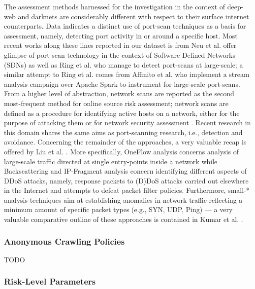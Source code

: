The assessment methods harnessed for the investigation in the context of deep-web and darknets are considerably different with respect to their surface internet counterparts. Data indicates a distinct use of port-scan \cite{GadgeP08,KikuchiFTD08} techniques as a basis for assessment, namely, detecting port activity in or around a specific host. Most recent works along these lines reported in our dataset is from Neu et al. \cite{NeuTLMOZ18} offer glimpse of port-scan technology in the context of Software-Defined Networks (SDNs) \cite{sorensen2012} as well as Ring et al. \cite{ring2018} who manage to detect port-scans at large-scale; a similar attempt to Ring et al. comes from Affinito et al. \cite{Affinito2018} who implement a stream analysis campaign over Apache Spark to instrument for large-scale port-scans. From a higher level of abstraction, network scans \cite{MazelFF16} are reported as the second most-frequent method for online source risk assessment; network scans are defined as a procedure for identifying active hosts on a network, either for the purpose of attacking them or for network security assessment \cite{LeckieR02}. Recent research in this domain shares the same aims as port-scanning research, i.e., detection and avoidance. Concerning the remainder of the approaches, a very valuable recap is offered by Liu et al. \cite{LiuF18}. More specifically, OneFlow analysis concerns analysis of large-scale traffic directed at single entry-points inside a network \cite{YegneswaranBP04} while Backscattering \cite{BalkanliZH15} and IP-Fragment analysis \cite{KimKH13} concern identifying different aspects of DDoS attacks, namely, response packets to (D)DoS attacks carried out elsewhere in the Internet and attempts to defeat packet filter policies. Furthermore, small-* analysis techniques aim at establishing anomalies in network traffic reflecting a minimum amount of specific packet types (e.g., SYN, UDP, Ping) --- a very valuable comparative outline of these approaches is contained in Kumar et al. \cite{kumar2014intrusion}.

\subsubsection{Anonymous Crawling Policies}

TODO\\

\subsubsection{Risk-Level Parameters}

